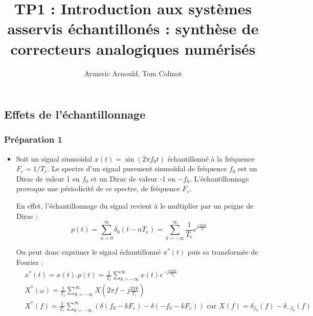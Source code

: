\documentclass[../../Cours_M1.tex]{subfiles}
\title{TP1 : Introduction aux systèmes asservis échantillonés : synthèse de correcteurs analogiques numérisés}
\author{Aymeric Arnould, Tom Colinot}
\begin{document}
\maketitle

\subsection*{Effets de l'échantillonnage}

\subsubsection*{Préparation 1}
\begin{itemize}
\item Soit un signal sinusoïdal $x(t) = \sin(2 \pi f_0 t)$ échantillonné à la fréquence $F_e = 1/T_e$. Le spectre d'un signal purement sinusoïdal de fréquence $f_0$ est un Dirac de valeur 1 en $f_0$ et un Dirac de valeur -1 en $-f_0$. L'échantillonnage provoque une périodicité de ce spectre, de fréquence $F_e$.

En effet, l'échantillonnage du signal revient à le multiplier par un peigne de Dirac : 
\[p(t) = \sum_{n=0}^{\infty} \delta_0(t-nT_e) = \sum_{k=-\infty}^{\infty} \frac{1}{T_e} e^{j\frac{2\pi k t}{T_e}} \]

On peut donc exprimer le signal échantillonné $x^*(t)$ puis sa transformée de Fourier :
\begin{align*}
& x^*(t) = x(t).p(t) = \frac{1}{T_e} \sum_{k=-\infty}^{\infty}x(t)e^{-j\frac{2\pi kt}{T_e}} \\
& X^*(\omega)= \frac{1}{T_e} \sum_{k=- \infty}^{\infty}X(2\pi f-j\frac{2\pi k}{T_e}) \\
& \boxed{X^*(f)= \frac{1}{T_e} \sum_{k=- \infty}^{\infty}(\delta(f_0-kF_e) - \delta(-f_0-kF_e))} \text{ car } X(f) = \delta_{f_0}(f) - \delta_{-f_0}(f)
\end{align*}

\begin{figure}[h!]
\centering
{}
\end{figure}
\end{itemize}
\end{document}
